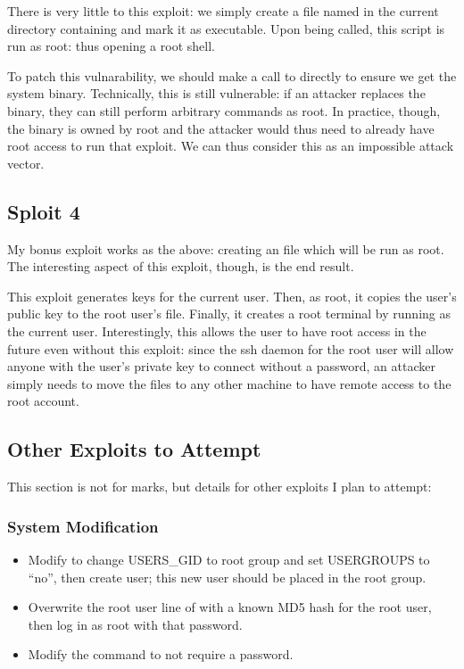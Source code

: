 \documentclass[12pt]{article}
\begin{document}
There is very little to this exploit: we simply create a file named  in the current directory containing  and mark it as executable. Upon  being called, this script is run as root: thus opening a root shell.

To patch this vulnarability, we should make a call to  directly to ensure we get the system  binary. Technically, this is still vulnerable: if an attacker replaces the  binary, they can still perform arbitrary commands as root. In practice, though, the  binary is owned by root and the attacker would thus need to already have root access to run that exploit. We can thus consider this as an impossible attack vector.

\subsection*{Sploit 4}
My bonus exploit works as the above: creating an  file which will be run as root. The interesting aspect of this exploit, though, is the end result.

This exploit generates  keys for the current user. Then, as root, it copies the user's public key to the root user's  file. Finally, it creates a root terminal by running  as the current user. Interestingly, this allows the user to have root access in the future even without this exploit: since the ssh daemon for the root user will allow anyone with the user's private key to connect without a password, an attacker simply needs to move the  files to any other machine to have remote access to the root account.

\subsection*{Other Exploits to Attempt}
This section is not for marks, but details for other exploits I plan to attempt:

\subsubsection*{System Modification}
\begin{itemize}
\item Modify  to change USERS\_GID to root group and set USERGROUPS to ``no'', then create user; this new user should be placed in the root group.
\item Overwrite the root user line of  with a known MD5 hash for the root user, then log in as root with that password.
\item Modify the  command to not require a password.
\end{itemize}
\end{document}
